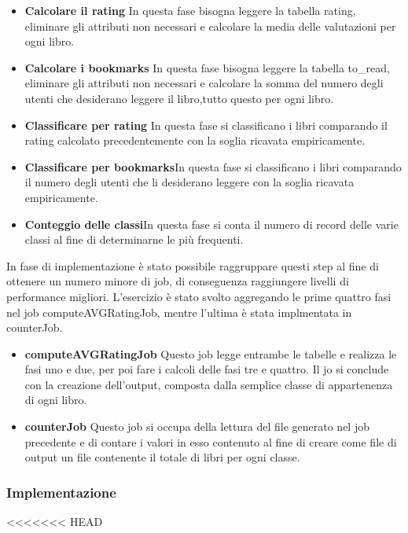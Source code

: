 \begin{itemize}
    \item \textbf{Calcolare il rating} In questa fase bisogna leggere la tabella rating, eliminare gli attributi non necessari
    e calcolare la media delle valutazioni per ogni libro.
    \item \textbf{Calcolare i bookmarks} In questa fase bisogna leggere la tabella to_read, eliminare gli attributi non necessari
    e calcolare la somma del numero degli utenti che desiderano leggere il libro,tutto questo per ogni libro.
    \item \textbf{Classificare per rating} In questa fase si classificano i libri comparando il rating calcolato
    precedentemente con la soglia ricavata empiricamente.
    \item \textbf{Classificare per bookmarks}In questa fase si classificano i libri comparando il numero degli utenti che li desiderano leggere
    con la soglia ricavata empiricamente.
     \item \textbf{Conteggio delle classi}In questa fase si conta il numero di record delle varie classi al fine di determinarne le più
     frequenti.
\end{itemize}

In fase di implementazione è stato possibile raggruppare questi step al fine di ottenere un numero minore di job, di conseguenza raggiungere
livelli di performance migliori.
L'esercizio è stato svolto aggregando le prime quattro fasi nel job computeAVGRatingJob,
mentre l'ultima è stata implmentata in counterJob.

\begin{itemize}
    \item \textbf{computeAVGRatingJob} Questo job legge entrambe le tabelle e realizza le fasi uno e due, per poi fare i calcoli delle fasi tre e quattro.
    Il jo si conclude con la creazione dell'output, composta dalla semplice classe di appartenenza di ogni libro.
    \item \textbf{counterJob} Questo job si occupa della lettura del file generato nel job precedente e di contare i valori in esso contenuto al
    fine di creare come file di output un file contenente il totale di libri per ogni classe.
\end{itemize}

\subsubsection{Implementazione}
<<<<<<< HEAD

